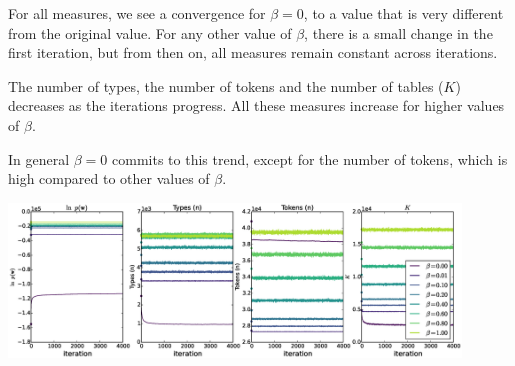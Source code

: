 For all measures, we see a convergence for $\beta = 0$, to a value that is very different from the original value. For any other value of $\beta$, there is a small change in the first iteration, but from then on, all measures remain constant across iterations.

The number of types, the number of tokens and the number of tables ($K$) decreases as the iterations progress. All these measures increase for higher values of $\beta$.

In general $\beta=0$ commits to this trend, except for the number of tokens, which is high compared to other values of $\beta$.

\begingroup
    \centering
    \includegraphics[width=0.9\textwidth]{images/PYP-iter_plots}
    \label{fig:PYPiter}
\endgroup

